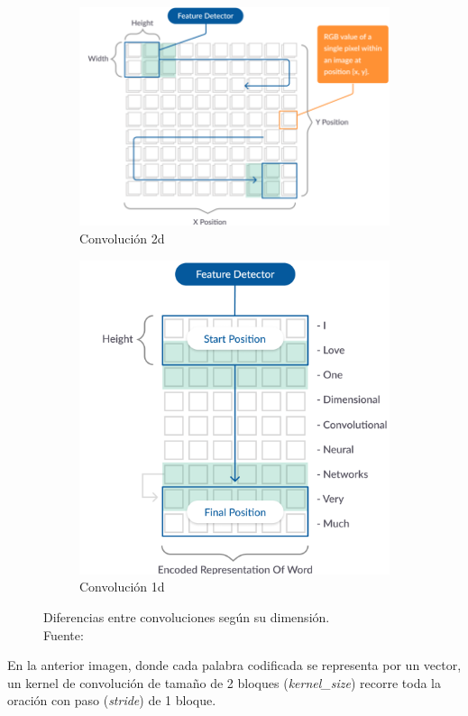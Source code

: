 \begin{itemize}
	\begin{figure}[!ht]
		\centering
		\small
		\begin{subfigure}{.5\textwidth}
			\centering
			\includegraphics[width=0.85\linewidth]{2/figures/2D-convolutional-example.png}
			\caption{Convolución 2d}
		\end{subfigure}%
		\begin{subfigure}{.5\textwidth}
			\centering
			\includegraphics[width=0.70\linewidth]{2/figures/1D-convolutional-example.png}
			\caption{Convolución 1d}
		\end{subfigure}
		\caption[Diferencias entre convoluciones según su dimensión]{Diferencias entre convoluciones según su dimensión.\\
		Fuente: \cite{tec_missinglink_conv1d}}
		\label{2:fig40}
	\end{figure}
	
	En la anterior imagen, donde cada palabra codificada se representa por un vector, un kernel de convolución de tamaño de 2 bloques (\textit{kernel\_size}) recorre toda la oración con paso (\textit{stride}) de 1 bloque.
	

\end{itemize}
